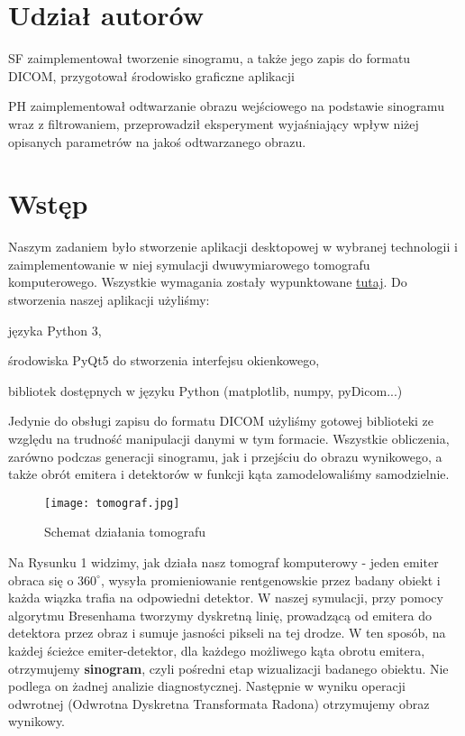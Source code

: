 \documentclass{article}
\begin{document}


\section*{Udział autorów}
\begin{tightlist}
\item SF zaimplementował tworzenie sinogramu, a także jego zapis do formatu DICOM, przygotował środowisko graficzne aplikacji
\item PH zaimplementował odtwarzanie obrazu wejściowego na podstawie sinogramu wraz z filtrowaniem, przeprowadził eksperyment wyjaśniający wpływ niżej opisanych parametrów na jakoś odtwarzanego obrazu.
\end{tightlist}



\section{Wstęp}

Naszym zadaniem było stworzenie aplikacji desktopowej w wybranej technologii i zaimplementowanie w niej symulacji dwuwymiarowego tomografu komputerowego. Wszystkie wymagania zostały wypunktowane \href{https://www.cs.put.poznan.pl/ibladek/students/iwm/0_projekt_wspolny_Tomograf.pdf}{tutaj}. Do stworzenia naszej aplikacji użyliśmy:
\begin{tightlist}
\item języka Python 3,
\item środowiska PyQt5 do stworzenia interfejsu okienkowego,
\item bibliotek dostępnych w języku Python (matplotlib, numpy, pyDicom...)
\end{tightlist}

Jedynie do obsługi zapisu do formatu DICOM użyliśmy gotowej biblioteki ze względu na trudność manipulacji danymi w tym formacie. Wszystkie obliczenia, zarówno podczas generacji sinogramu, jak i przejściu do obrazu wynikowego, a także obrót emitera i detektorów w funkcji kąta zamodelowaliśmy samodzielnie.

\begin{figure}[!htbp]
\begin{center}
\texttt{[image: tomograf.jpg]}
\end{center}
\caption{Schemat działania tomografu}
\label{fig:1Tdelta}
\end{figure}

Na Rysunku 1 widzimy, jak działa nasz tomograf komputerowy - jeden emiter obraca się o $360 ^{\circ}$, wysyła promieniowanie rentgenowskie przez badany obiekt i każda wiązka trafia na odpowiedni detektor. W naszej symulacji, przy pomocy algorytmu Bresenhama tworzymy dyskretną linię, prowadzącą od emitera do detektora przez obraz i sumuje jasności pikseli na tej drodze. W ten sposób, na każdej ścieżce emiter-detektor, dla każdego możliwego kąta obrotu emitera, otrzymujemy \textbf{sinogram}, czyli pośredni etap wizualizacji badanego obiektu. Nie podlega on żadnej analizie diagnostycznej. Następnie w wyniku operacji odwrotnej (Odwrotna Dyskretna Transformata Radona) otrzymujemy obraz wynikowy. 
\end{document}
